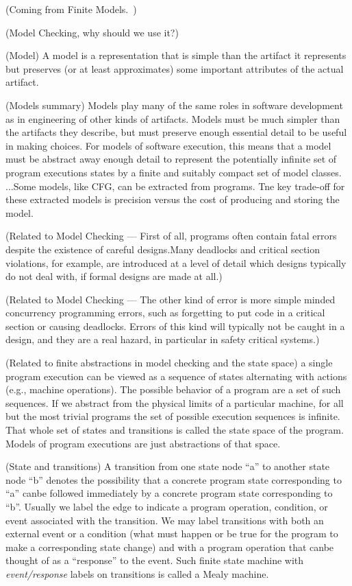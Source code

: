 \label{sec:program-analysis}

(Coming from Finite Models.~\cite{BookPezze2008})

(Model Checking, why should we use it?)

(Model) A model is a representation that is simple than the artifact it represents but preserves (or at least approximates) some important attributes of the actual artifact.~\cite{BookPezze2008}

(Models summary) Models play many of the same roles in software development as in engineering of other kinds of artifacts. Models must be much simpler than the artifacts they describe, but must preserve enough essential detail to be useful in making choices. For models of software execution, this means that a model must be abstract away enough detail to represent the potentially infinite set of program executions states by a finite and suitably compact set of model classes. ...Some models, like CFG, can be extracted from programs. Tne key trade-off for these extracted models is precision versus the cost of producing and storing the model.~\cite{BookPezze2008}

(Related to Model Checking --- First of all, programs often contain fatal errors despite the existence of careful designs.Many deadlocks and critical section violations, for example, are introduced at a level of detail which designs typically do not deal with, if formal designs are made at all.) ~\cite{Visser2003}

(Related to Model Checking --- The other kind of error is more simple minded concurrency programming errors, such as forgetting to put code in a critical section or causing deadlocks. Errors of this kind will typically not be caught in a design, and they are a real hazard, in particular in safety critical systems.) ~\cite{Visser2003}

(Related to finite abstractions in model checking and the state space) 
a single program execution can be viewed as a sequence of states alternating with actions (e.g., machine operations). The possible behavior of a program are a set of such sequences. If we abstract from the physical limits of a particular machine, for all but the most trivial programs the set of possible execution sequences is infinite. That whole set of states and transitions is called the state space of the program. Models of program executions are just abstractions of that space.~\cite{BookPezze2008}

(State and transitions)
A transition from one state node ``a'' to another state node ``b'' denotes the possibility that a concrete program state corresponding to ``a'' canbe followed immediately by a concrete program state corresponding to ``b''. Usually we label the edge to indicate a program operation, condition, or event associated with the transition. We may label transitions with both an external event or a condition (what must happen or be true for the program to make a corresponding state change) and with a program operation that canbe thought of as a ``response'' to the event. Such finite state machine with \textit{event/response} labels on transitions is called a Mealy machine.~\cite{BookPezze2008}

